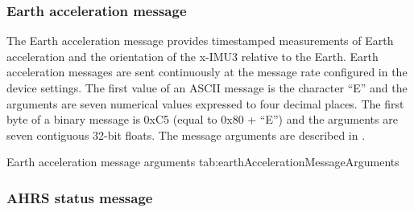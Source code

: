 \subsubsection{Earth acceleration message}

The Earth acceleration message provides timestamped measurements of Earth acceleration and the orientation of the x-IMU3 relative to the Earth.  Earth acceleration messages are sent continuously at the message rate configured in the device settings.  The first value of an \ac{ASCII} message is the character \enquote{E} and the arguments are seven numerical values expressed to four decimal places.  The first byte of a binary message is 0xC5 (equal to 0x80 + \enquote{E}) and the arguments are seven contiguous 32-bit floats.  The message arguments are described in .

\begingroup
    \def\tempArgumentA{Quaternion W element}
    \def\tempArgumentB{Quaternion X element}
    \def\tempArgumentC{Quaternion Y element}
    \def\tempArgumentD{Quaternion Z element}
    \def\tempArgumentE{Earth acceleration X axis in g}
    \def\tempArgumentF{Earth acceleration Y axis in g}
    \def\tempArgumentG{Earth acceleration Z axis in g}
    \def\tempCaption{Earth acceleration message arguments}
    \def\tempLabel{tab:earthAccelerationMessageArguments}
    \dataMessageTable
    {Earth acceleration message arguments}
    {tab:earthAccelerationMessageArguments}
\endgroup

\begingroup
    \def\tempNameA{Quaternion W element}
    \def\tempNameB{Quaternion X element}
    \def\tempNameC{Quaternion Y element}
    \def\tempNameD{Quaternion Z element}
    \def\tempNameE{Earth acceleration X axis}
    \def\tempNameF{Earth acceleration Y axis}
    \def\tempNameG{Earth acceleration Z axis}
    \def\tempValueA{1}
    \def\tempValueB{0}
    \def\tempValueC{0}
    \def\tempValueD{0}
    \def\tempValueE{0}
    \def\tempValueF{0}
    \def\tempValueG{0}
    \def\tempAsciiFirst{E}
    \def\tempAsciiA{1.0000}
    \def\tempAsciiB{0.0000}
    \def\tempAsciiC{0.0000}
    \def\tempAsciiD{0.0000}
    \def\tempAsciiE{0.0000}
    \def\tempAsciiF{0.0000}
    \def\tempAsciiG{0.0000}
    \def\tempBinaryFirst{C5}
    \def\tempBinaryA{00 00 80 3F}
    \def\tempBinaryB{00 00 00 00}
    \def\tempBinaryC{00 00 00 00}
    \def\tempBinaryD{00 00 00 00}
    \def\tempBinaryE{00 00 00 00}
    \def\tempBinaryF{00 00 00 00}
    \def\tempBinaryG{00 00 00 00}
    \dataMessageExample
\endgroup

\subsubsection{\acs{AHRS} status message}

